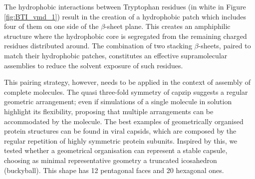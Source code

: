 
The hydrophobic interactions between Tryptophan residues (in white in Figure \ref{fig:BTI_vmd_1}) result in the creation of a hydrophobic patch which includes four of them on one side of the $\beta$-sheet plane.
%
This creates an amphiphilic structure where the hydrophobic core is segregated from the remaining charged residues distributed around.
%
The combination of two stacking $\beta$-sheets, paired to match their hydrophobic patches, constitutes an effective supramolecular assemblies to reduce the solvent exposure of such residues.

This pairing strategy, however, needs to be applied in the context of assembly of complete molecules.
%
The quasi three-fold symmetry of capzip suggests a regular geometric arrangement; even if simulations of a single molecule in solution highlight its flexibility, proposing that multiple arrangements can be accommodated by the molecule.
%
The best examples of geometrically organised protein structures can be found in viral capsids, which are composed by the regular repetition of highly symmetric protein subunits.
%
Inspired by this, we tested whether a geometrical organisation can represent a stable capsule, choosing as minimal representative geometry a truncated icosahedron (buckyball). This shape has 12 pentagonal faces and 20 hexagonal ones.

